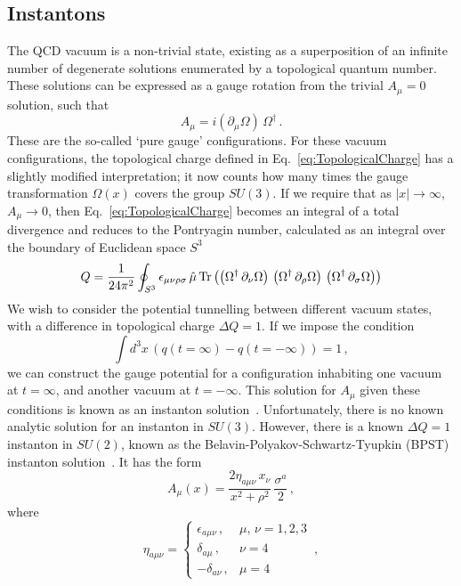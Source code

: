 \subsection{Instantons}
The QCD vacuum is a non-trivial state, existing as a superposition of an infinite number of degenerate solutions enumerated by a topological quantum number. These solutions can be expressed as a gauge rotation from the trivial $A_\mu=0$ solution, such that
%
\begin{equation}
A_\mu = i(\partial_\mu \Omega)\,\Omega^\dagger\, .
\end{equation}
%
These are the so-called `pure gauge' configurations. For these vacuum configurations, the topological charge defined in Eq.~\ref{eq:TopologicalCharge} has a slightly modified interpretation; it now counts how many times the gauge transformation $\Omega(x)$ covers the group $SU(3)$. If we require that as $|x|\rightarrow \infty$, $A_\mu\rightarrow 0$, then  Eq.~\ref{eq:TopologicalCharge} becomes an integral of a total divergence and reduces to the Pontryagin number, calculated as an integral over the boundary of Euclidean space $S^3$~\cite{ryder1996quantum}
%
\begin{equation}
Q = \frac{1}{24\pi^2}\oint_{S^3} \epsilon_{\mu\nu\rho\sigma} \, \hat{\mu}\operatorname{Tr}\left(\left(\Omega^\dagger \,\partial_\nu \Omega\right)\,\left(\Omega^\dagger \,\partial_\rho \Omega\right)\,\left(\Omega^\dagger \,\partial_\sigma \Omega\right)\right)
\end{equation}
%
We wish to consider the potential tunnelling between different vacuum states, with a difference in topological charge $\Delta Q=1$. If we impose the condition
%
\begin{equation}
\int d^3x \,\left(q(t=\infty)-q(t=-\infty)\right)=1\, ,
\end{equation}
%
we can construct the gauge potential for a configuration inhabiting one vacuum at $t=\infty$, and another vacuum at $t=-\infty$. This solution for $A_\mu$ given these conditions is known as an instanton solution~\cite{Schafer:1996wv}. Unfortunately, there is no known analytic solution for an instanton in $SU(3)$. However, there is a known $\Delta Q=1$ instanton in $SU(2)$, known as the Belavin-Polyakov-Schwartz-Tyupkin (BPST) instanton solution~\cite{Belavin:1975fg}. It has the form
%
\begin{equation}
A_\mu(x) = \frac{2\eta_{a\mu\nu}\,x_\nu}{x^2+\rho^2}\,\frac{\sigma^a}{2}\, ,
\label{eq:InstantonSolution}
\end{equation}
%
where
%
\begin{equation}
\eta_{a\mu\nu} =
\begin{cases}
\epsilon_{a\mu\nu}\, , & \mu,\,\nu = 1,2,3\\
\delta_{a\mu}\, , & \nu=4\\
-\delta_{a\nu}\, , & \mu=4
\end{cases}\, ,
\label{eq:EtaSymbol}
\end{equation}
